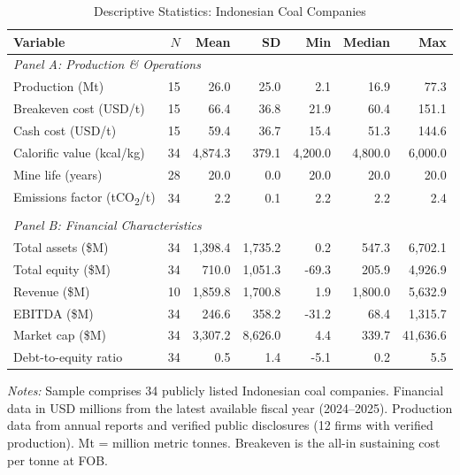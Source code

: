 \begin{table}[htbp]
\centering
\caption{Descriptive Statistics: Indonesian Coal Companies}
\label{tab:coal_desc}
\footnotesize
\begin{tabular}{lrrrrrr}
\toprule
Variable & $N$ & Mean & SD & Min & Median & Max \\
\midrule
\multicolumn{7}{l}{\textit{Panel A: Production \& Operations}} \\[2pt]
  Production (Mt) & 15 & 26.0 & 25.0 & 2.1 & 16.9 & 77.3 \\
  Breakeven cost (USD/t) & 15 & 66.4 & 36.8 & 21.9 & 60.4 & 151.1 \\
  Cash cost (USD/t) & 15 & 59.4 & 36.7 & 15.4 & 51.3 & 144.6 \\
  Calorific value (kcal/kg) & 34 & 4,874.3 & 379.1 & 4,200.0 & 4,800.0 & 6,000.0 \\
  Mine life (years) & 28 & 20.0 & 0.0 & 20.0 & 20.0 & 20.0 \\
  Emissions factor (tCO\textsubscript{2}/t) & 34 & 2.2 & 0.1 & 2.2 & 2.2 & 2.4 \\
\\[4pt]
\multicolumn{7}{l}{\textit{Panel B: Financial Characteristics}} \\[2pt]
  Total assets (\$M) & 34 & 1,398.4 & 1,735.2 & 0.2 & 547.3 & 6,702.1 \\
  Total equity (\$M) & 34 & 710.0 & 1,051.3 & -69.3 & 205.9 & 4,926.9 \\
  Revenue (\$M) & 10 & 1,859.8 & 1,700.8 & 1.9 & 1,800.0 & 5,632.9 \\
  EBITDA (\$M) & 34 & 246.6 & 358.2 & -31.2 & 68.4 & 1,315.7 \\
  Market cap (\$M) & 34 & 3,307.2 & 8,626.0 & 4.4 & 339.7 & 41,636.6 \\
  Debt-to-equity ratio & 34 & 0.5 & 1.4 & -5.1 & 0.2 & 5.5 \\
\bottomrule
\end{tabular}

\smallskip
\noindent \textit{Notes:} Sample comprises 34 publicly listed Indonesian coal companies. Financial data in USD millions from the latest available fiscal year (2024--2025). Production data from annual reports and verified public disclosures (12 firms with verified production). Mt = million metric tonnes. Breakeven is the all-in sustaining cost per tonne at FOB.
\end{table}
